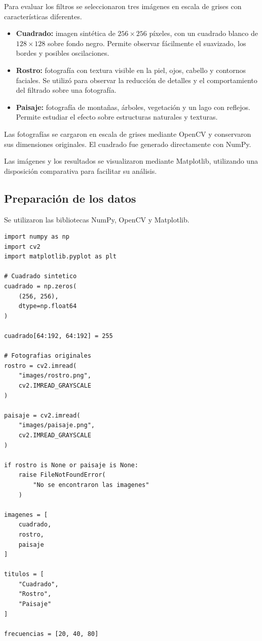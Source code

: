 \documentclass[11pt,letterpaper]{article}
\begin{document}
Para evaluar los filtros se seleccionaron
tres imágenes en escala de grises con
características diferentes.

\begin{itemize}

    \item \textbf{Cuadrado:}
    imagen sintética de $256\times256$ píxeles,
    con un cuadrado blanco de $128\times128$
    sobre fondo negro. Permite observar
    fácilmente el suavizado, los bordes
    y posibles oscilaciones.

    \item \textbf{Rostro:}
    fotografía con textura visible en la piel,
    ojos, cabello y contornos faciales.
    Se utilizó para observar la reducción
    de detalles y el comportamiento del
    filtrado sobre una fotografía.

    \item \textbf{Paisaje:}
    fotografía de montañas, árboles,
    vegetación y un lago con reflejos.
    Permite estudiar el efecto sobre
    estructuras naturales y texturas.

\end{itemize}

Las fotografías se cargaron en escala de grises
mediante OpenCV y conservaron sus dimensiones
originales. El cuadrado fue generado
directamente con NumPy.

Las imágenes y los resultados se visualizaron
mediante Matplotlib, utilizando una disposición
comparativa para facilitar su análisis.

\subsection{Preparación de los datos}

Se utilizaron las bibliotecas NumPy, OpenCV
y Matplotlib.

\begin{lstlisting}
import numpy as np
import cv2
import matplotlib.pyplot as plt

# Cuadrado sintetico
cuadrado = np.zeros(
    (256, 256),
    dtype=np.float64
)

cuadrado[64:192, 64:192] = 255

# Fotografias originales
rostro = cv2.imread(
    "images/rostro.png",
    cv2.IMREAD_GRAYSCALE
)

paisaje = cv2.imread(
    "images/paisaje.png",
    cv2.IMREAD_GRAYSCALE
)

if rostro is None or paisaje is None:
    raise FileNotFoundError(
        "No se encontraron las imagenes"
    )

imagenes = [
    cuadrado,
    rostro,
    paisaje
]

titulos = [
    "Cuadrado",
    "Rostro",
    "Paisaje"
]

frecuencias = [20, 40, 80]
\end{lstlisting}
\end{document}
